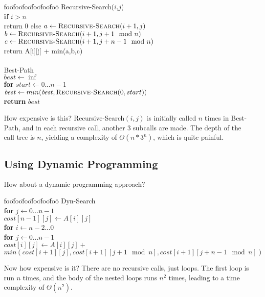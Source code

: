 \documentclass[12pt]{article}
\newenvironment{alg}{
\begin{tabbing}
foo\=foo\=foo\=foo\=foo\=foo\= \kill}
{\end{tabbing}}
\begin{document}
\begin{alg}
{\sc Recursive-Search}($i$,$j$) \\
\> {\bf if} $i > n$ \\
\> \> return 0
\> else
\> \> $a \leftarrow \mbox{\sc Recursive-Search}(i+1,j) $ \\
\> \> $b \leftarrow \mbox{\sc Recursive-Search}(i+1,j+1 \mod n) $ \\
\> \> $c \leftarrow \mbox{\sc Recursive-Search}(i+1,j+n-1 \mod n) $ \\
\> \> return A[i][j] + min(a,b,c) \\
\\
{\sc Best-Path} \\
\> $\mathit{best} \leftarrow \inf$ \\
\> {\bf for} $\mathit{start} \leftarrow 0 \dots n-1$ \\
\> \> $\mathit{best} \leftarrow min(\mathit{best},\mbox{\sc Recursive-Search}(0,start))$ \\
\> {\bf return} $\mathit{best}$
\end{alg}

How expensive is this?  {\sc Recursive-Search}$(i,j)$ is initially called
$n$ times in {\sc Best-Path}, and in each recursive call, another 3
subcalls are made.  The depth of the call tree is $n$, yielding a
complexity of $\Theta(n*3^n)$, which is quite painful.

\subsection{Using Dynamic Programming}
How about a dynamic programming approach?

\begin{alg}
{\sc Dyn-Search} \\
\> {\bf for} $j \leftarrow 0 \dots n-1$ \\
\> \> $cost[n-1][j] \leftarrow A[i][j]$ \\
\> {\bf for} $i \leftarrow n-2 \dots 0$ \\
\> \> {\bf for} $j \leftarrow 0 \dots n-1$ \\
\> \> \> $cost[i][j] \leftarrow A[i][j] +$ \\
\> \> \> \> $min(cost[i+1][j],cost[i+1][j+1 \mod n],cost[i+1][j+n-1 \mod n])$ 
\end{alg}

Now how expensive is it?  There are no recursive calls, just loops.  The
first loop is run $n$ times, and the body of the nested loops runs $n^2$
times, leading to a time complexity of $\Theta(n^2)$.
\end{document}
